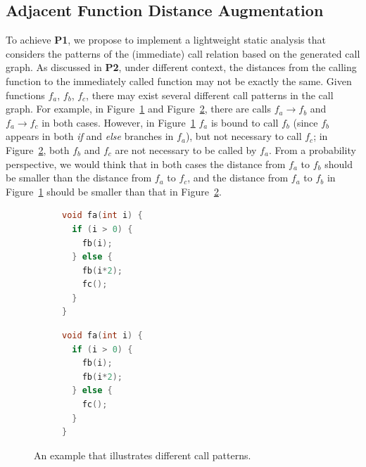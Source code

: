 \subsection{Adjacent Function Distance Augmentation} \label{subsec:functionDist}
To achieve \textbf{P1}, we propose to implement a lightweight static analysis that considers the patterns of the (immediate) call relation based on the generated call graph.
As discussed in \textbf{P2}, under different context, the distances from the calling function to the immediately called function may not be exactly the same. 
Given functions $f_a$, $f_b$, $f_c$, there may exist several different call patterns in the call graph. 
For example, in Figure~\ref{subfig:dist1} and Figure~\ref{subfig:dist2}, there are calls $f_a\rightarrow f_b$  and  $f_a\rightarrow f_c$ in both cases. 
However, in Figure~\ref{subfig:dist1}  $f_a$ is bound to call $f_b$ (since $f_b$ appears in both \emph{if} and \emph{else} branches in $f_a$), but not necessary to call $f_c$; in Figure~\ref{subfig:dist2}, both $f_b$ and $f_c$ are not necessary to be called by $f_a$.
From a probability perspective, we would think that in both cases the distance from $f_a$ to $f_b$ should be smaller than the distance from $f_a$ to $f_c$, and the distance from $f_a$ to $f_b$ in Figure~\ref{subfig:dist1} should be smaller than that in  Figure~\ref{subfig:dist2}. 


\begin{figure}[t]
    \centering
\begin{subfigure}[b]{0.36\columnwidth}
\begin{lstlisting}[language=c]
void fa(int i) {
  if (i > 0) {
    fb(i);
  } else {
    fb(i*2);
    fc();
  }
}
\end{lstlisting}  
\caption{}
\label{subfig:dist1}      
\end{subfigure}
\hspace{0.1in}
\centering
\begin{subfigure}[b]{0.36\columnwidth}
\begin{lstlisting}[language=c]        
void fa(int i) {
  if (i > 0) {
    fb(i);
    fb(i*2);
  } else {
    fc();
  }
}        
\end{lstlisting}
\caption{}
\label{subfig:dist2}      
\end{subfigure}
\caption{An example that illustrates different call patterns.}
\label{figure:dists}
\end{figure}

